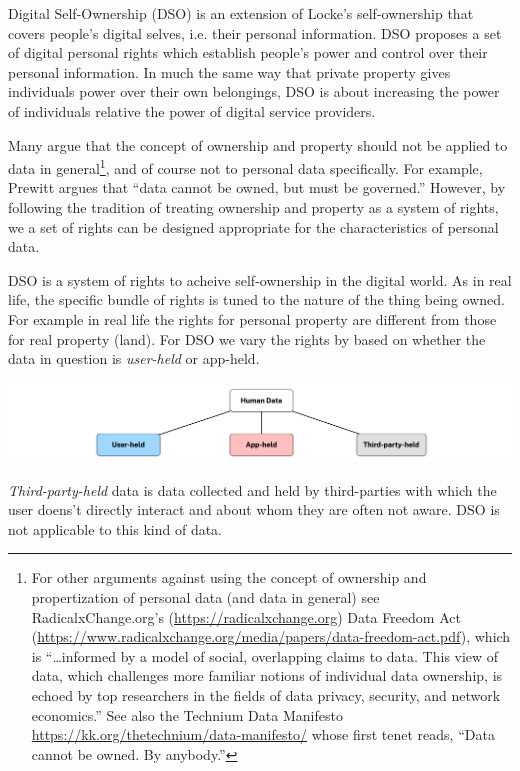 \documentclass[11pt, oneside]{article}   	%
\begin{document}
Digital Self-Ownership (DSO) is an extension of Locke's self-ownership that covers people's digital selves, i.e. their personal information. DSO proposes a set of digital personal rights which establish people's power and control over their personal information. In much the same way that private property gives individuals power over their own belongings, DSO is about increasing the power of individuals relative the power of digital service providers. 

Many argue that the concept of ownership and property should not be applied to data in general\footnote{For other arguments against using the concept of ownership and propertization of personal data (and data in general) see RadicalxChange.org's (\url{https://radicalxchange.org}) Data Freedom Act (\url{https://www.radicalxchange.org/media/papers/data-freedom-act.pdf}), which is “…informed by a model of social, overlapping claims to data. This view of data, which challenges more familiar notions of individual data ownership, is echoed by top researchers in the fields of data privacy, security, and network economics.” See also the Technium Data Manifesto \url{https://kk.org/thetechnium/data-manifesto/} whose first tenet reads, “Data cannot be owned. By anybody.”}, and of course not to personal data specifically. For example, Prewitt\cite{Prewitt2021} argues that “data cannot be owned, but must be governed.”  However, by following the tradition of treating ownership and property as a system of rights, we a set of rights can be designed appropriate for the characteristics of personal data.  

DSO is a system of rights to acheive self-ownership in the digital world. As in real life, the specific bundle of rights is tuned to the nature of the thing being owned. For example in real life the rights for personal property are different from those for real property (land). For DSO we vary the rights by based on whether the data in question is \emph{user-held}\cite{Jurcys2021} or app-held. 

\includegraphics[width=\textwidth]{./images/app-held-user-held-3rd.png}

\emph{Third-party-held} data is data collected and held by third-parties with which the user doens't directly interact and about whom they are often not aware. DSO is not applicable to this kind of data.
\end{document}
